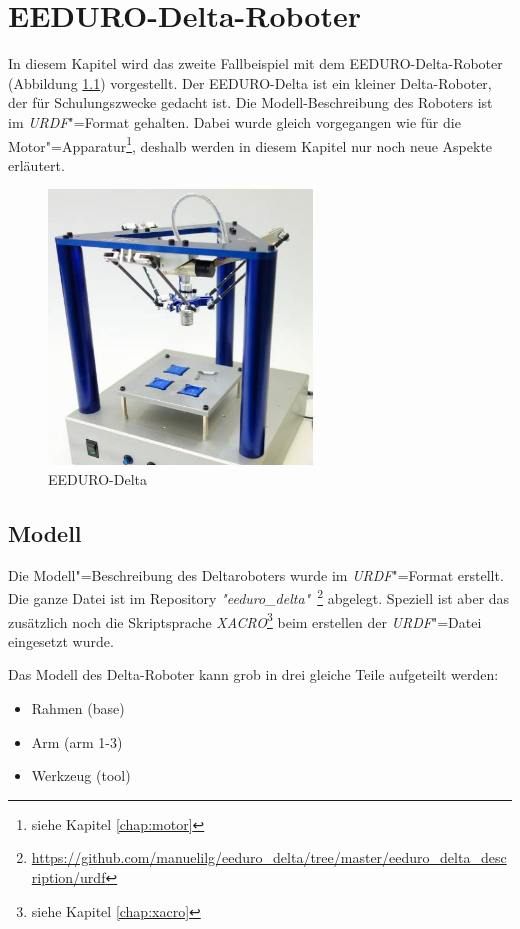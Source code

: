 \chapter{EEDURO-Delta-Roboter}
In diesem Kapitel wird das zweite Fallbeispiel mit dem EEDURO-Delta-Roboter (Abbildung \ref{Ab:eeduro}) vorgestellt.
Der EEDURO-Delta ist ein kleiner Delta-Roboter, der für Schulungszwecke gedacht ist.
Die Modell-Beschreibung des Roboters ist im \textit{URDF}"=Format gehalten.
Dabei wurde gleich vorgegangen wie für die Motor"=Apparatur\footnote{siehe Kapitel \ref{chap:motor}}, deshalb werden in diesem Kapitel nur noch neue Aspekte erläutert.
\begin{figure}[ht!]
	\centering
	\includegraphics[width=7cm]{images/eeduro_delta.png}
	\caption{EEDURO-Delta \cite{eeduro}}
	\label{Ab:eeduro}
\end{figure}


\section{Modell}
\label{chap:delta-modell}
Die Modell"=Beschreibung des Deltaroboters wurde im \textit{URDF}"=Format erstellt.
Die ganze Datei ist im Repository \textit{\textit{"}eeduro\_delta\textit{"}}~\footnote{\url{https://github.com/manuelilg/eeduro_delta/tree/master/eeduro_delta_description/urdf}} abgelegt.
Speziell ist aber das zusätzlich noch die Skriptsprache \textit{XACRO}\footnote{siehe Kapitel \ref{chap:xacro}} beim erstellen der \textit{URDF}"=Datei eingesetzt wurde.

Das Modell des Delta-Roboter kann grob in drei gleiche Teile aufgeteilt werden:
\begin{itemize}
\item Rahmen (base)
\item Arm (arm 1-3)
\item Werkzeug (tool)
\end{itemize}

